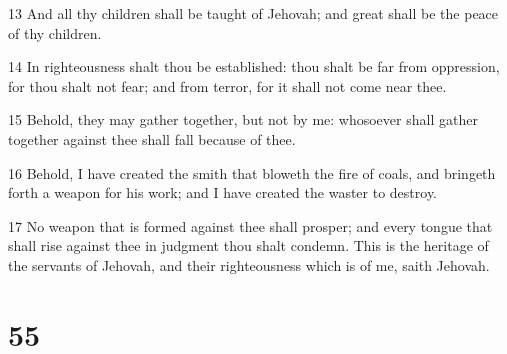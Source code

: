 \par 13 And all thy children shall be taught of Jehovah; and great shall be the peace of thy children.
\par 14 In righteousness shalt thou be established: thou shalt be far from oppression, for thou shalt not fear; and from terror, for it shall not come near thee.
\par 15 Behold, they may gather together, but not by me: whosoever shall gather together against thee shall fall because of thee.
\par 16 Behold, I have created the smith that bloweth the fire of coals, and bringeth forth a weapon for his work; and I have created the waster to destroy.
\par 17 No weapon that is formed against thee shall prosper; and every tongue that shall rise against thee in judgment thou shalt condemn. This is the heritage of the servants of Jehovah, and their righteousness which is of me, saith Jehovah.

\chapter{55}

